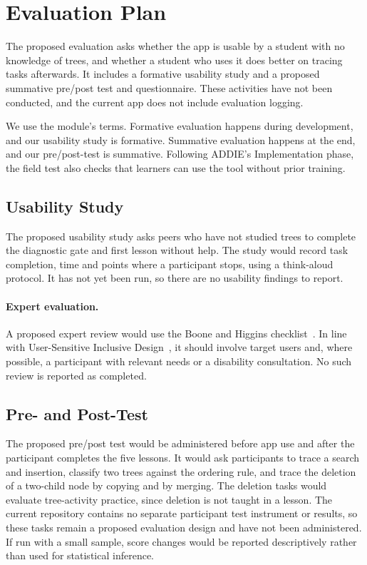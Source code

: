 \section{Evaluation Plan}\label{sec:id-evaluation}


The proposed evaluation asks whether the app is usable by a student with no knowledge of trees, and whether a student who uses it does better on tracing tasks afterwards. It includes a formative usability study and a proposed summative pre/post test and questionnaire. These activities have not been conducted, and the current app does not include evaluation logging.

We use the module's terms. Formative evaluation happens during development, and our usability study is formative. Summative evaluation happens at the end, and our pre/post-test is summative. Following ADDIE's Implementation phase, the field test also checks that learners can use the tool without prior training.

\subsection{Usability Study}
The proposed usability study asks peers who have not studied trees to complete the diagnostic gate and first lesson without help. The study would record task completion, time and points where a participant stops, using a think-aloud protocol. It has not yet been run, so there are no usability findings to report.

\paragraph{Expert evaluation.} A proposed expert review would use the Boone and Higgins checklist~\cite{article}. In line with User-Sensitive Inclusive Design~\cite{Newell2011}, it should involve target users and, where possible, a participant with relevant needs or a disability consultation. No such review is reported as completed.

\subsection{Pre- and Post-Test}
The proposed pre/post test would be administered before app use and after the participant completes the five lessons. It would ask participants to trace a search and insertion, classify two trees against the ordering rule, and trace the deletion of a two-child node by copying and by merging. The deletion tasks would evaluate tree-activity practice, since deletion is not taught in a lesson. The current repository contains no separate participant test instrument or results, so these tasks remain a proposed evaluation design and have not been administered. If run with a small sample, score changes would be reported descriptively rather than used for statistical inference.

